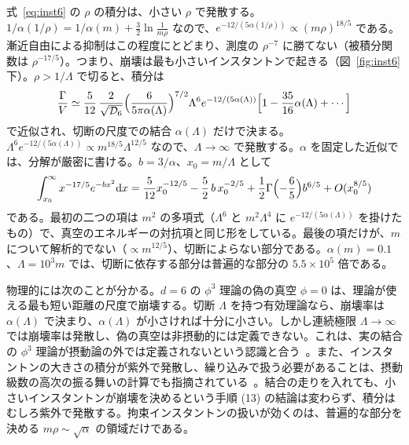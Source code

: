 \documentclass[a4paper,10pt]{ltjsarticle}
\newcommand{\dd}{\mathrm{d}}
\begin{document}
式~\eqref{eq:inst6} の $\rho$ の積分は、小さい $\rho$ で発散する。$1/\alpha(1/\rho)=1/\alpha(m)+\frac32\ln\frac1{m\rho}$ なので、$e^{-12/(5\alpha(1/\rho))}\propto(m\rho)^{18/5}$ である。漸近自由による抑制はこの程度にとどまり、測度の $\rho^{-7}$ に勝てない（被積分関数は $\rho^{-17/5}$）。つまり、崩壊は最も小さいインスタントンで起きる（図~\ref{fig:inst6} 下）。$\rho>1/\Lambda$ で切ると、積分は
\begin{equation*}
\frac{\Gamma}{V}\simeq\frac5{12}\,\frac{2}{\sqrt{\mathcal D_6}}\Bigl(\frac{6}{5\pi\alpha(\Lambda)}\Bigr)^{7/2}\Lambda^6e^{-12/(5\alpha(\Lambda))}\Bigl[1-\frac{35}{16}\alpha(\Lambda)+\cdots\Bigr]
\end{equation*}
で近似され、切断の尺度での結合 $\alpha(\Lambda)$ だけで決まる。$\Lambda^6e^{-12/(5\alpha(\Lambda))}\propto m^{18/5}\Lambda^{12/5}$ なので、$\Lambda\to\infty$ で発散する。$\alpha$ を固定した近似では、分解が厳密に書ける。$b=3/\alpha$、$x_0=m/\Lambda$ として
\begin{equation*}
\int_{x_0}^\infty x^{-17/5}e^{-bx^2}\dd x=\frac5{12}x_0^{-12/5}-\frac52\,b\,x_0^{-2/5}+\frac12\Gamma\Bigl(-\frac65\Bigr)b^{6/5}+O(x_0^{8/5})
\end{equation*}
である。最初の二つの項は $m^2$ の多項式（$\Lambda^6$ と $m^2\Lambda^4$ に $e^{-12/(5\alpha(\Lambda))}$ を掛けたもの）で、真空のエネルギーの対抗項と同じ形をしている。最後の項だけが、$m$ について解析的でない（$\propto m^{12/5}$）、切断によらない部分である。$\alpha(m)=0.1$、$\Lambda=10^3m$ では、切断に依存する部分は普遍的な部分の $5.5\times10^5$ 倍である。

物理的には次のことが分かる。$d=6$ の $\phi^3$ 理論の偽の真空 $\phi=0$ は、理論が使える最も短い距離の尺度で崩壊する。切断 $\Lambda$ を持つ有効理論なら、崩壊率は $\alpha(\Lambda)$ で決まり、$\alpha(\Lambda)$ が小さければ十分に小さい。しかし連続極限 $\Lambda\to\infty$ では崩壊率は発散し、偽の真空は非摂動的には定義できない。これは、実の結合の $\phi^3$ 理論が摂動論の外では定義されないという認識と合う~\cite{mckane19}。また、インスタントンの大きさの積分が紫外で発散し、繰り込みで扱う必要があることは、摂動級数の高次の振る舞いの計算でも指摘されている~\cite{mckane19}。結合の走りを入れても、小さいインスタントンが崩壊を決めるという手順 (13) の結論は変わらず、積分はむしろ紫外で発散する。拘束インスタントンの扱いが効くのは、普遍的な部分を決める $m\rho\sim\sqrt{\alpha}$ の領域だけである。
\end{document}

